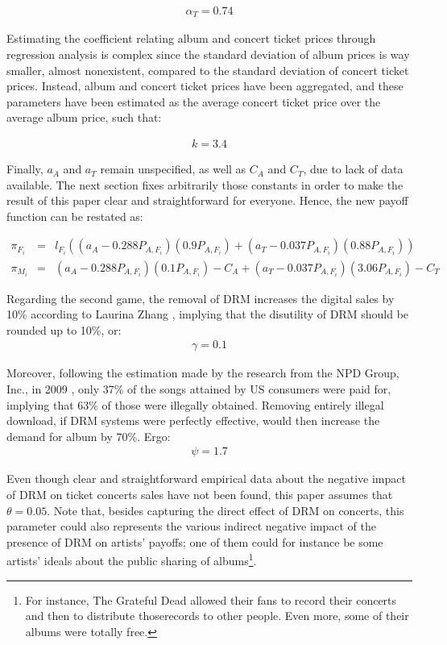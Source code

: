 \documentclass[a4paper,12pt]{article}
\numberwithin{equation}{section}
\begin{document}
\begin{eqnarray*}
\alpha_{T} = 0.74
\end{eqnarray*}

Estimating the coefficient relating album and concert ticket prices
through regression analysis is complex since the standard deviation
of album prices is way smaller, almost nonexistent, compared to the
standard deviation of concert ticket prices. Instead, album and concert
ticket prices have been aggregated, and these parameters have been estimated
as the average concert ticket price over the average album price,
such that:

\begin{eqnarray*}
k=3.4
\end{eqnarray*}

Finally, $a_{A}$ and $a_{T}$ remain unspecified, as well as $C_{A}$ and
$C_{T}$, due to lack of data available. The next section fixes arbitrarily
those constants in order to make the result of this paper clear and
straightforward for everyone. Hence, the new payoff function can be
restated as:

\begin{eqnarray*}
\pi_{F_{i}} & = & l_{F_{i}}((a_{A}-0.288P_{A,F_{i}})(0.9P_{A,F_{i}})+(a_{T}-0.037P_{A,F_{i}})(0.88P_{A,F_{i}}))\\
\pi_{M_i} & = & (a_{A}-0.288P_{A,F_{i}})(0.1P_{A,F_{i}})-C_{A}+(a_{T}-0.037P_{A,F_{i}})(3.06P_{A,F_{i}})-C_{T}
\end{eqnarray*}

Regarding the second game, the removal of DRM increases the digital
sales by 10\% according to Laurina Zhang \cite{zhang2014}, implying
that the disutility of DRM should be rounded up to 10\%, or:
\begin{eqnarray*}
\gamma=0.1
\end{eqnarray*}

Moreover, following the estimation made by the research from the NPD
Group, Inc., in 2009 \cite{npd2009}, only 37\% of the songs attained
by US consumers were paid for, implying that 63\% of those were illegally
obtained. Removing entirely illegal download, if DRM systems were
perfectly effective, would then increase the demand for album by 70\%.
Ergo:
\begin{eqnarray*}
\psi=1.7
\end{eqnarray*}

Even though clear and straightforward empirical data about the negative
impact of DRM on ticket concerts sales have not been found, this paper
assumes that $\theta=0.05$. Note that, besides capturing the direct
effect of DRM on concerts, this parameter could also represents the
various indirect negative impact of the presence of DRM on artists’
payoffs; one of them could for instance be some artists’ ideals about
the public sharing of albums\footnote{
For instance, The Grateful Dead allowed their fans to record their
concerts and then to distribute thoserecords to other people. Even
more, some of their albums were totally free.
}.\\
\end{document}
